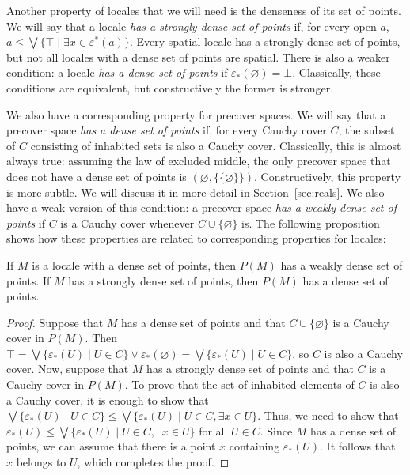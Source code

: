 \documentclass[reqno]{amsart}
\theoremstyle{definition}
\theoremstyle{remark}
\numberwithin{figure}{section}
\begin{document}
Another property of locales that we will need is the denseness of its set of points.
We will say that a locale \emph{has a strongly dense set of points} if, for every open $a$, $a \leq \bigvee \{ \top \mid \exists x \in \varepsilon^*(a) \}$.
Every spatial locale has a strongly dense set of points, but not all locales with a dense set of points are spatial.
There is also a weaker condition: a locale \emph{has a dense set of points} if $\varepsilon_*(\varnothing) = \bot$.
Classically, these conditions are equivalent, but constructively the former is stronger.

We also have a corresponding property for precover spaces.
We will say that a precover space \emph{has a dense set of points} if, for every Cauchy cover $C$, the subset of $C$ consisting of inhabited sets is also a Cauchy cover.
Classically, this is almost always true: assuming the law of excluded middle, the only precover space that does not have a dense set of points is $(\varnothing, \{ \{ \varnothing \} \})$.
Constructively, this property is more subtle.
We will discuss it in more detail in Section~\ref{sec:reals}.
We also have a weak version of this condition: a precover space \emph{has a weakly dense set of points} if $C$ is a Cauchy cover whenever $C \cup \{ \varnothing \}$ is.
The following proposition shows how these properties are related to corresponding properties for locales:

\begin{prop}
If $M$ is a locale with a dense set of points, then $P(M)$ has a weakly dense set of points.
If $M$ has a strongly dense set of points, then $P(M)$ has a dense set of points.
\end{prop}
\begin{proof}
Suppose that $M$ has a dense set of points and that $C \cup \{ \varnothing \}$ is a Cauchy cover in $P(M)$.
Then $\top = \bigvee \{ \varepsilon_*(U) \mid U \in C \} \vee \varepsilon_*(\varnothing) = \bigvee \{ \varepsilon_*(U) \mid U \in C \}$, so $C$ is also a Cauchy cover.
Now, suppose that $M$ has a strongly dense set of points and that $C$ is a Cauchy cover in $P(M)$.
To prove that the set of inhabited elements of $C$ is also a Cauchy cover, it is enough to show that $\bigvee \{ \varepsilon_*(U) \mid U \in C \} \leq \bigvee \{ \varepsilon_*(U) \mid U \in C, \exists x \in U \}$.
Thus, we need to show that $\varepsilon_*(U) \leq \bigvee \{ \varepsilon_*(U) \mid U \in C, \exists x \in U \}$ for all $U \in C$.
Since $M$ has a dense set of points, we can assume that there is a point $x$ containing $\varepsilon_*(U)$.
It follows that $x$ belongs to $U$, which completes the proof.
\end{proof}
\end{document}

